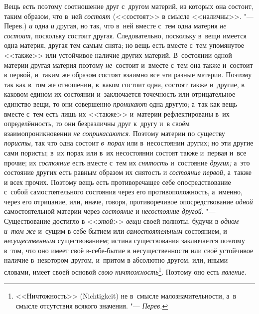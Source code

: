 Вещь есть поэтому соотношение друг с~другом материй, из которых она состоит,
таким образом, что в~ней {\em состоят} (<<состоят>> в
смысле <<наличны>>. "--- Перев.) {\em и} одна
{\em и} другая, но так, что в~ней вместе с~тем одна
материя {\em не состоит,} поскольку состоит другая.
Следовательно, поскольку в~вещи имеется одна материя, другая тем самым
снята; но вещь есть вместе с~тем упомянутое <<также>> или устойчивое наличие
других материй. В~состоянии одной материи другая материя поэтому
{\em не}~состоит и~вместе с~тем она также и~состоит в
первой, и~таким же образом состоят взаимно все эти разные материи. Поэтому
так как в~том же отношении, в~каком состоит одна, состоят также и~другие, в
каковом едином их состоянии и~заключается точечность или отрицательное
единство вещи, то они совершенно {\em проникают} одна
другую; а~так как вещь вместе с~тем есть лишь их <<также>> и~материи
рефлектированы в~их определённость, то они безразличны друг к~другу и~в
своём взаимопроникновении {\em не соприкасаются}.
Поэтому материи по существу {\em пористы,} так что одна
состоит {\em в~порах} или в~несостоянии других; но эти
другие сами пористы; в~их порах или в~их несостоянии состоят также и~первая
и~все прочие; их {\em состояние} есть вместе с~тем их
{\em снятость} и~состояние {\em других;} а~это состояние других есть равным
образом их снятость и {\em состояние первой,} а~также и
всех прочих. Поэтому вещь есть противоречащее себе опосредствование с~собой
самостоятельного состояния через его противоположность, а~именно, через его
отрицание, или, иначе, говоря, противоречивое опосредствование
{\em одной} самостоятельной материи через {\em состояние} и {\em несостояние
другой}. "--- Существование достигло в <<{\em этой}>> {\em вещи} своей
полноты, будучи в {\em одном и~том же} и~сущим-в-себе
бытием или {\em самостоятельным} состоянием, и
{\em несущественным} существованием; истина
существования заключается поэтому в~том, что оно имеет своё в-себе-бытие в
несущественности или своё устойчивое наличие в~некотором другом, и~притом в
абсолютно другом, или, иными словами, имеет своей основой
{\em свою ничтожность}\footnote{<<Ничтожность>> (Nichtig\-keit) не
в~смысле малозначительности, а~в смысле отсутствия всякого
значения. "--- {\em Перев.}}. Поэтому оно есть {\em явление}.


